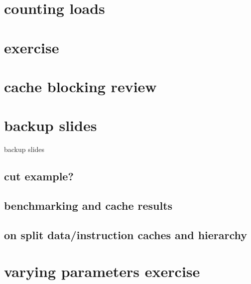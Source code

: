 %

\section{counting loads}
%


\section{exercise}


\section{cache blocking review}


\section{backup slides}
\begin{frame}{backup slides}
\end{frame}

\subsection{cut example?}


\subsection{benchmarking and cache results}


\subsection{on split data/instruction caches and hierarchy}


\section{varying parameters exercise}


